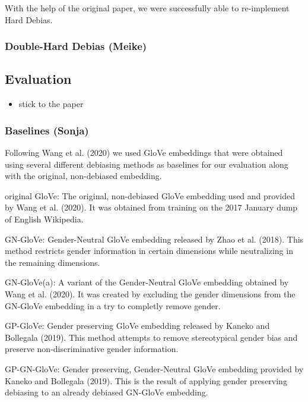 \documentclass[
  english,
  man,floatsintext]{apa6}
\providecommand{\tightlist}{%
  \setlength{\itemsep}{0pt}\setlength{\parskip}{0pt}}
\begin{document}
With the help of the original paper, we were successfully able to re-implement Hard Debias.

\hypertarget{double-hard-debias-meike}{%
\subsubsection{Double-Hard Debias (Meike)}\label{double-hard-debias-meike}}

\hypertarget{evaluation}{%
\subsection{Evaluation}\label{evaluation}}

\begin{itemize}
\tightlist
\item
  stick to the paper
\end{itemize}

\hypertarget{baselines-sonja}{%
\subsubsection{Baselines (Sonja)}\label{baselines-sonja}}

Following Wang et al. (2020) we used GloVe embeddings that were obtained using several different debiasing methods as baselines for our evaluation along with the original, non-debiased embedding.

original GloVe: The original, non-debiased GloVe embedding used and provided by Wang et al. (2020). It was obtained from training on the 2017 January dump of English Wikipedia.

GN-GloVe: Gender-Neutral GloVe embedding released by Zhao et al. (2018). This method restricts gender information in certain dimensions while neutralizing in the remaining dimensions.

GN-GloVe(a): A variant of the Gender-Neutral GloVe embedding obtained by Wang et al. (2020). It was created by excluding the gender dimensions from the GN-GloVe embedding in a try to completly remove gender.

GP-GloVe: Gender preserving GloVe embedding released by Kaneko and Bollegala (2019). This method attempts to remove stereotypical gender bias and preserve non-discriminative gender information.

GP-GN-GloVe: Gender preserving, Gender-Neutral GloVe embedding provided by Kaneko and Bollegala (2019). This is the result of applying gender preserving debiasing to an already debiased GN-GloVe embedding.
\end{document}
